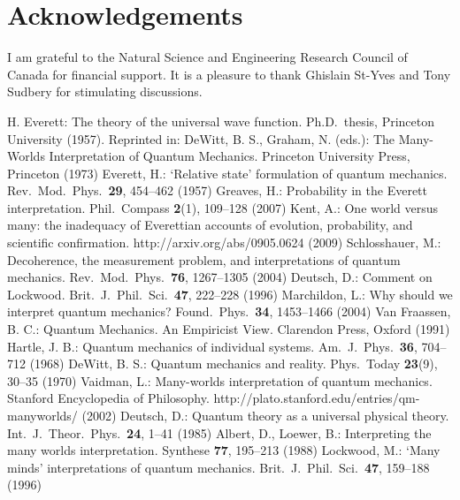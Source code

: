 \documentclass[12pt]{article}
\begin{document}
\section*{Acknowledgements}
%
I am grateful to the Natural Science and
Engineering Research Council of Canada for
financial support.  It is a pleasure to
thank Ghislain St-Yves and Tony Sudbery
for stimulating discussions.
%
\begin{thebibliography}{99}
%
%
 H. Everett:
The theory of the universal wave function.
Ph.D.\ thesis, Princeton University (1957).
Reprinted in: DeWitt, B. S., Graham, N. (eds.):
The Many-Worlds Interpretation of Quantum Mechanics. 
Princeton University Press, Princeton (1973)
%
 Everett, H.:
`Relative state' formulation of quantum mechanics.
Rev.\ Mod.\ Phys.\ \textbf{29}, 454--462 (1957)
%
 Greaves, H.:
Probability in the Everett interpretation.
Phil.\ Compass \textbf{2}(1), 109--128 (2007)
%
 Kent, A.:
One world versus many: the inadequacy of
Everettian accounts of evolution, probability,
and scientific confirmation.
http://arxiv.org/abs/0905.0624 (2009)
%
 Schlosshauer, M.:
Decoherence, the measurement problem, and interpretations
of quantum mechanics.
Rev.\ Mod.\ Phys.\ \textbf{76}, 1267--1305 (2004)
%
 Deutsch, D.:
Comment on Lockwood.
Brit.\ J.\ Phil.\ Sci.\ \textbf{47}, 222--228 (1996)
%
 Marchildon, L.:
Why should we interpret quantum mechanics?
Found.\ Phys.\ \textbf{34}, 1453--1466 (2004)
%
 Van Fraassen, B. C.:
Quantum Mechanics.  An Empiricist View.
Clarendon Press, Oxford (1991)
%
 Hartle, J. B.:
Quantum mechanics of individual systems.
Am.\ J.\ Phys.\ \textbf{36}, 704--712 (1968)
%
 DeWitt, B. S.:
Quantum mechanics and reality.
Phys.\ Today \textbf{23}(9), 30--35 (1970)
%
 Vaidman, L.:
Many-worlds interpretation of quantum mechanics.
Stanford Encyclopedia of Philosophy.
http://plato.stanford.edu/entries/qm-manyworlds/ (2002)
%
 Deutsch, D.:
Quantum theory as a universal physical theory.
Int.\ J.\ Theor.\ Phys.\ \textbf{24}, 1--41 (1985)
%
 Albert, D., Loewer, B.:
Interpreting the many worlds interpretation.
Synthese \textbf{77}, 195--213 (1988)
%
 Lockwood, M.:
`Many minds' interpretations of quantum mechanics.
Brit.\ J.\ Phil.\ Sci.\ \textbf{47}, 159--188 (1996)

\end{thebibliography}
\end{document}
